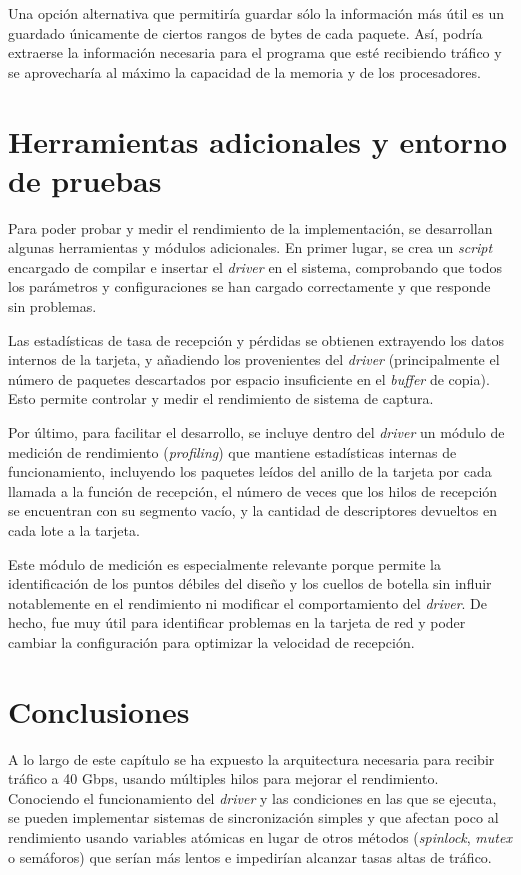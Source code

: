 \documentclass[twoside, 12pt, draft]{epstfg}
\begin{document}
Una opción alternativa que permitiría guardar sólo la información más útil es un guardado únicamente de ciertos rangos de bytes de cada paquete. Así, podría extraerse la información necesaria para el programa que esté recibiendo tráfico y se aprovecharía al máximo la capacidad de la memoria y de los procesadores.

\section{Herramientas adicionales y entorno de pruebas}

Para poder probar y medir el rendimiento de la implementación, se desarrollan algunas herramientas y módulos adicionales. En primer lugar, se crea un \textit{script} encargado de compilar e insertar el \textit{driver} en el sistema, comprobando que todos los parámetros y configuraciones se han cargado correctamente y que responde sin problemas.

Las estadísticas de tasa de recepción y pérdidas se obtienen extrayendo los datos internos de la tarjeta, y añadiendo los provenientes del \textit{driver} (principalmente el número de paquetes descartados por espacio insuficiente en el \textit{buffer} de copia). Esto permite controlar y medir el rendimiento de sistema de captura.

Por último, para facilitar el desarrollo, se incluye dentro del \textit{driver} un módulo de medición de rendimiento (\textit{profiling}) que mantiene estadísticas internas de funcionamiento, incluyendo los paquetes leídos del anillo de la tarjeta por cada llamada a la función de recepción, el número de veces que los hilos de recepción se encuentran con su segmento vacío, y la cantidad de descriptores devueltos en cada lote a la tarjeta.

Este módulo de medición es especialmente relevante porque permite la identificación de los puntos débiles del diseño y los cuellos de botella sin influir notablemente en el rendimiento ni modificar el comportamiento del \textit{driver}. De hecho, fue muy útil para identificar problemas en la tarjeta de red y poder cambiar la configuración para optimizar la velocidad de recepción.

\section{Conclusiones}

A lo largo de este capítulo se ha expuesto la arquitectura necesaria para recibir tráfico a 40 Gbps, usando múltiples hilos para mejorar el rendimiento. Conociendo el funcionamiento del \textit{driver} y las condiciones en las que se ejecuta, se pueden implementar sistemas de sincronización simples y que afectan poco al rendimiento usando variables atómicas en lugar de otros métodos (\textit{spinlock}, \textit{mutex} o semáforos) que serían más lentos e impedirían alcanzar tasas altas de tráfico.
\end{document}
